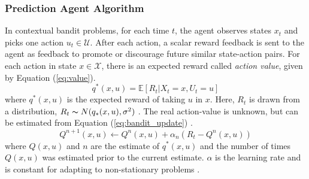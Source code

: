\subsubsection{Prediction Agent Algorithm}

In contextual bandit problems, for each time $t$, the agent observes states $x_t$ and picks one action $u_t \in \mathcal{U}$.  After each action, a scalar reward feedback is sent to the agent as feedback to promote or discourage future similar state-action pairs.  For each action in state $x \in \mathcal{X}$, there is an expected reward called \textit{action value}, given by Equation (\ref{eq:value}).
\begin{equation}
    q^*(x, u) = {\mathbb{E}} [R_t | X_t = x, U_t = u]
    \label{eq:value}
\end{equation}
where $q^*(x, u)$ is the expected reward of taking $u$ in $x$. Here, $R_t$ is drawn from a distribution, $R_t \thicksim N(q_*(x, u), \sigma^2)$ \cite{sutton}. The real action-value is unknown, but can be estimated from Equation (\ref{eq:bandit_update}) \cite{bandits_ref9}.
\begin{equation}
    Q^{n+1}(x, u) \leftarrow Q^n(x, u) + \alpha_n (R_t - Q^n(x, u))
    \label{eq:bandit_update}
\end{equation}
where $Q(x, u)$ and $n$ are the estimate of $q^*(x, u)$ and the number of times $Q(x, u)$ was estimated prior to the current estimate.  $\alpha$ is the learning rate and is constant for adapting to non-stationary problems \cite{sutton}.  

